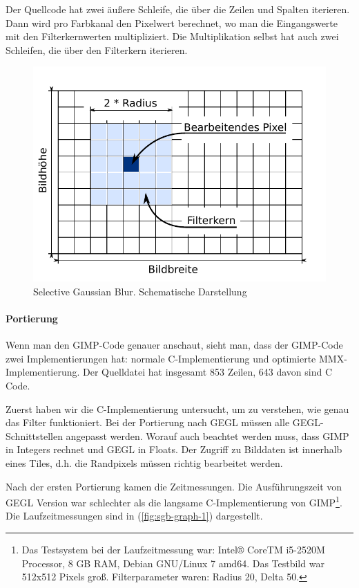 Der Quellcode hat zwei äußere Schleife, die über die Zeilen und Spalten iterieren. Dann wird pro Farbkanal den Pixelwert berechnet, wo man die Eingangswerte mit den Filterkernwerten multipliziert. Die Multiplikation selbst hat auch zwei Schleifen, die über den Filterkern iterieren.   


\begin{figure}
\centering
\includegraphics[scale=0.9]{graphs/sgb-grid.pdf}
\caption{Selective Gaussian Blur. Schematische Darstellung}
\label{fig:sgb-grid}
\end{figure} 


\paragraph{Portierung}
Wenn man den GIMP-Code genauer anschaut, sieht man, dass der GIMP-Code zwei Implementierungen hat: normale C-Implementierung und optimierte MMX-Implementierung. Der Quelldatei hat insgesamt 853 Zeilen, 643 davon sind C Code. 

Zuerst haben wir die C-Implementierung untersucht, um zu verstehen, wie genau das Filter funktioniert. Bei der Portierung nach GEGL müssen alle GEGL-Schnittstellen angepasst werden. Worauf auch beachtet werden muss, dass GIMP in Integers rechnet und GEGL in Floats. Der Zugriff zu Bilddaten ist innerhalb eines Tiles, d.h. die Randpixels müssen richtig bearbeitet werden. 

Nach der ersten Portierung kamen die Zeitmessungen. Die Ausführungszeit von GEGL Version war schlechter als die langsame C-Implementierung von GIMP\footnote{Das Testsystem bei der Laufzeitmessung war: Intel® CoreTM i5-2520M Processor, 8 GB RAM, Debian GNU/Linux 7 amd64. Das Testbild war 512x512 Pixels groß. Filterparameter waren: Radius 20, Delta 50.}. Die Laufzeitmessungen sind in (\autoref{fig:sgb-graph-1}) dargestellt.

